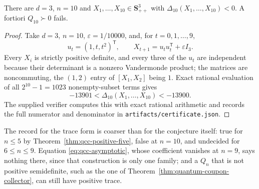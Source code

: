 \begin{theorem}\label{thm:quantum-coupon-collector-trace}
There are $d=3$, $n=10$ and $X_1,\ldots,X_{10}\in\mathbf{S}_{++}^{3}$ with $\Delta_{10}(X_1,\ldots,X_{10})<0$.  A fortiori $Q_{10}\succ0$ fails.
\end{theorem}
\begin{proof}
Take $d=3$, $n=10$, $\varepsilon=1/10000$, and, for $t=0,1,\ldots,9$,
\[
u_t=(1,t,t^2)^{\mathsf T},\qquad X_{t+1}=u_tu_t^{\mathsf T}+\varepsilon I_3.
\]
Every $X_i$ is strictly positive definite, and every three of the $u_t$ are independent because their determinant is a nonzero Vandermonde product; the matrices are noncommuting, the $(1,2)$ entry of $[X_1,X_2]$ being $1$.  Exact rational evaluation of all $2^{10}-1=1023$ nonempty-subset terms gives
\[
-13901<\Delta_{10}(X_1,\ldots,X_{10})<-13900.
\]
The supplied verifier computes this with exact rational arithmetic and records the full numerator and denominator in \texttt{artifacts/certificate.json}.
\end{proof}

\begin{remark}[Scope]
The record for the trace form is coarser than for the conjecture itself: true
for $n\le5$ by Theorem~\ref{thm:qcc-positive-five}, false at $n=10$, and undecided for
$6\le n\le9$.  Equation \eqref{eq:qcc-asymptotic}, whose coefficient vanishes at
$n=9$, says nothing there, since that construction is only one family; and a
$Q_n$ that is not positive semidefinite, such as the one of
Theorem~\ref{thm:quantum-coupon-collector}, can still have positive trace.
\end{remark}

